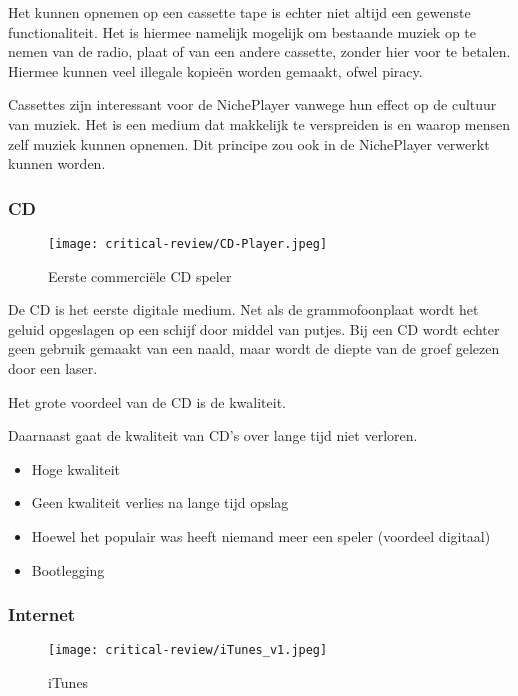 Het kunnen opnemen op een cassette tape is echter niet altijd een gewenste functionaliteit. Het is hiermee namelijk mogelijk om bestaande muziek op te nemen van de radio, plaat of van een andere cassette, zonder hier voor te betalen. Hiermee kunnen veel illegale kopieën worden gemaakt, ofwel piracy. 

Cassettes zijn interessant voor de NichePlayer vanwege hun effect op de cultuur van muziek. Het is een medium dat makkelijk te verspreiden is en waarop mensen zelf muziek kunnen opnemen. Dit principe zou ook in de NichePlayer verwerkt kunnen worden.


\subsubsection*{CD}
\begin{wrapfigure}{r}{0.25\textwidth}
    \centering
    \texttt{[image: critical-review/CD-Player.jpeg]}
    \caption{Eerste commerciële CD speler}
    \label{fig:critical-review:cp-player}
\end{wrapfigure}
De CD is het eerste digitale medium. Net als de grammofoonplaat wordt het geluid opgeslagen op een schijf door middel van putjes. Bij een CD wordt echter geen gebruik gemaakt van een naald, maar wordt de diepte van de groef gelezen door een laser.

Het grote voordeel van de CD is de kwaliteit.

Daarnaast gaat de kwaliteit van CD's over lange tijd niet verloren.


\begin{itemize}
    \item Hoge kwaliteit
    \item Geen kwaliteit verlies na lange tijd opslag
    \item Hoewel het populair was heeft niemand meer een speler (voordeel digitaal)
    \item Bootlegging
\end{itemize}

\subsubsection*{Internet}
\begin{wrapfigure}{r}{0.25\textwidth}
    \centering
    \texttt{[image: critical-review/iTunes\_v1.jpeg]}
    \caption{iTunes}
    \label{fig:critical-review:iTunes}
\end{wrapfigure}

